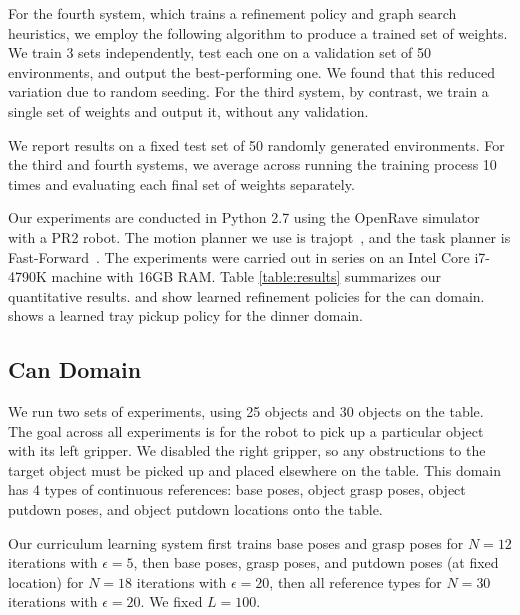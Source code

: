 For the fourth system, which trains a refinement policy and graph search heuristics, we employ the following
algorithm to produce a trained set of weights. We train 3 sets independently, test each
one on a validation set of 50 environments, and output the best-performing one. We found that this
reduced variation due to random seeding. For the third system, by contrast, we train a single
set of weights and output it, without any validation.

We report results on a fixed test set of 50 randomly generated environments.
For the third and fourth systems, we average across running the training process 10 times
and evaluating each final set of weights separately.

Our experiments are conducted in Python 2.7 using the OpenRave simulator~\cite{Diankov_2008_6117} with a PR2 robot.
The motion planner we use is trajopt~\cite{schulman2013finding}, and the task planner is Fast-Forward~\cite{FF}.
The experiments were carried out in series on an Intel Core i7-4790K machine with 16GB RAM.
Table \ref{table:results} summarizes our quantitative results.  and 
show learned refinement policies for the can domain.  shows a learned tray pickup policy
for the dinner domain.

\subsection{Can Domain}
We run two sets of experiments, using 25 objects and 30 objects on the table.
The goal across all experiments is for the robot to pick up a particular object with its
left gripper. We disabled the right gripper, so any obstructions to the target object must be picked up and
placed elsewhere on the table. This domain has 4 types of continuous references: base poses, object grasp
poses, object putdown poses, and object putdown locations onto the table.

Our curriculum learning system first trains base poses and grasp poses for $N = 12$ iterations with $\epsilon = 5$,
then base poses, grasp poses, and putdown poses (at fixed location) for $N = 18$ iterations with $\epsilon = 20$,
then all reference types for $N = 30$ iterations with $\epsilon = 20$. We fixed $L = 100$.


